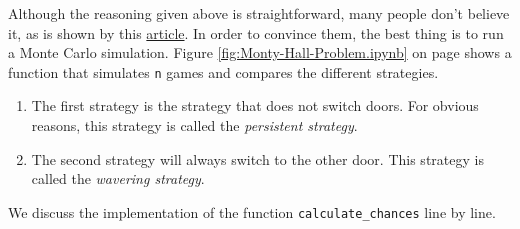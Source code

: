 Although the reasoning given above is straightforward, many people don't believe it, as is shown
by this \href{https://priceonomics.com/the-time-everyone-corrected-the-worlds-smartest/}{article}.  In order to
convince them, the best thing is to run a Monte Carlo simulation.  Figure \ref{fig:Monty-Hall-Problem.ipynb}
on page 
\pageref{fig:Monty-Hall-Problem.ipynb} shows a function that simulates \texttt{n} games and compares the
different strategies.  
\begin{enumerate}
\item The first strategy is the strategy that does not switch doors.
      For obvious reasons, this strategy is called the \emph{persistent strategy}.
\item The second strategy will always switch to the other door.
      This strategy is called the \emph{wavering strategy}.
\end{enumerate}
We discuss the implementation of the function \texttt{calculate\_chances} line by line.
